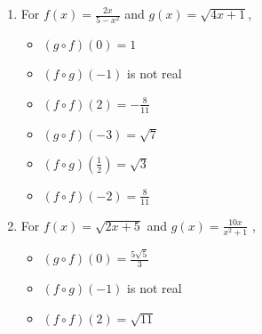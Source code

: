 \begin{enumerate}
\begin{multicols}{3}
\begin{itemize}
\end{itemize}

\end{multicols}

\item  For  $f(x) = \frac{2x}{5-x^2}$ and $g(x) = \sqrt{4x+1}$,
\begin{multicols}{3}

\begin{itemize}

\item  $(g\circ f)(0) = 1$

\item  $(f\circ g)(-1)$ is not real

\item  $(f \circ f)(2) = -\frac{8}{11}$

\end{itemize}

\end{multicols}

\begin{multicols}{3}

\begin{itemize}

\item  $(g\circ f)(-3) = \sqrt{7}$

\item  $(f\circ g)\left(\frac{1}{2}\right) = \sqrt{3}$

\item  $(f \circ f)(-2) = \frac{8}{11}$

\end{itemize}

\end{multicols}

\item  For  $f(x) =\sqrt{2x+5}$ and $g(x) = \frac{10x}{x^2+1}$ ,
\begin{multicols}{3}

\begin{itemize}

\item  $(g\circ f)(0) = \frac{5\sqrt{5}}{3}$

\item  $(f\circ g)(-1)$ is not real

\item  $(f \circ f)(2) = \sqrt{11}$

\end{itemize}

\end{multicols}


\end{enumerate}
